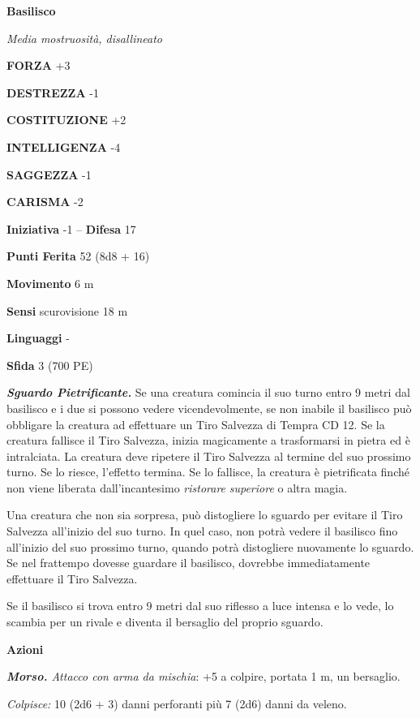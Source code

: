 \begin{multicols}{2}
\medskip{}\textbf{Basilisco}

\emph{Media mostruosità, disallineato}

\textbf{FORZA} +3

\textbf{DESTREZZA} -1

\textbf{COSTITUZIONE} +2

\textbf{INTELLIGENZA} -4

\textbf{SAGGEZZA} -1

\textbf{CARISMA} -2

\textbf{Iniziativa} -1 -- \textbf{Difesa} 17

\textbf{Punti Ferita} 52 (8d8 + 16)

\textbf{Movimento} 6 m

\textbf{Sensi} scurovisione 18 m

\textbf{Linguaggi} -

\textbf{Sfida} 3 (700 PE)

\emph{\textbf{Sguardo Pietrificante.}} Se una creatura comincia il suo turno entro 9 metri dal basilisco e i due si possono vedere vicendevolmente, se non  inabile il basilisco può obbligare la creatura ad effettuare un Tiro Salvezza di Tempra CD 12. Se la creatura fallisce il Tiro Salvezza, inizia magicamente a trasformarsi in pietra ed è intralciata. La creatura deve ripetere il Tiro Salvezza al termine del suo prossimo turno. Se lo riesce, l'effetto termina. Se lo fallisce, la creatura è pietrificata finché non viene liberata dall'incantesimo \emph{ristorare} \emph{superiore} o altra magia.

Una creatura che non sia sorpresa, può distogliere lo sguardo per evitare il Tiro Salvezza all'inizio del suo turno. In quel caso, non potrà vedere il basilisco fino all'inizio del suo prossimo turno, quando potrà distogliere nuovamente lo sguardo. Se nel frattempo dovesse guardare il basilisco, dovrebbe immediatamente effettuare il Tiro Salvezza.

Se il basilisco si trova entro 9 metri dal suo riflesso a luce intensa e lo vede, lo scambia per un rivale e diventa il bersaglio del proprio sguardo.

\textbf{Azioni}

\emph{\textbf{Morso.} Attacco con arma da mischia}: +5 a colpire, portata 1 m, un bersaglio.

\emph{Colpisce:} 10 (2d6 + 3) danni perforanti più 7 (2d6) danni da veleno.


\end{multicols}
